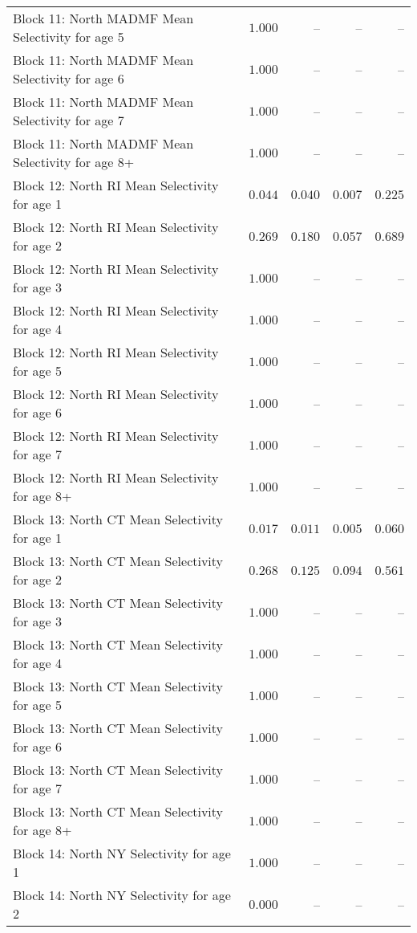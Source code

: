 \documentclass[
]{article}
\begin{document}
\begin{landscape}
\begin{longtable}[t]{lrrrr}
Block 11: North MADMF Mean Selectivity for age 5 & $1.000$ & -- & -- & --\\
Block 11: North MADMF Mean Selectivity for age 6 & $1.000$ & -- & -- & --\\
Block 11: North MADMF Mean Selectivity for age 7 & $1.000$ & -- & -- & --\\
\addlinespace
Block 11: North MADMF Mean Selectivity for age 8+ & $1.000$ & -- & -- & --\\
Block 12: North RI Mean Selectivity for age 1 & $0.044$ & $0.040$ & $0.007$ & $0.225$\\
Block 12: North RI Mean Selectivity for age 2 & $0.269$ & $0.180$ & $0.057$ & $0.689$\\
Block 12: North RI Mean Selectivity for age 3 & $1.000$ & -- & -- & --\\
Block 12: North RI Mean Selectivity for age 4 & $1.000$ & -- & -- & --\\
\addlinespace
Block 12: North RI Mean Selectivity for age 5 & $1.000$ & -- & -- & --\\
Block 12: North RI Mean Selectivity for age 6 & $1.000$ & -- & -- & --\\
Block 12: North RI Mean Selectivity for age 7 & $1.000$ & -- & -- & --\\
Block 12: North RI Mean Selectivity for age 8+ & $1.000$ & -- & -- & --\\
Block 13: North CT Mean Selectivity for age 1 & $0.017$ & $0.011$ & $0.005$ & $0.060$\\
\addlinespace
Block 13: North CT Mean Selectivity for age 2 & $0.268$ & $0.125$ & $0.094$ & $0.561$\\
Block 13: North CT Mean Selectivity for age 3 & $1.000$ & -- & -- & --\\
Block 13: North CT Mean Selectivity for age 4 & $1.000$ & -- & -- & --\\
Block 13: North CT Mean Selectivity for age 5 & $1.000$ & -- & -- & --\\
Block 13: North CT Mean Selectivity for age 6 & $1.000$ & -- & -- & --\\
\addlinespace
Block 13: North CT Mean Selectivity for age 7 & $1.000$ & -- & -- & --\\
Block 13: North CT Mean Selectivity for age 8+ & $1.000$ & -- & -- & --\\
Block 14: North NY Selectivity for age 1 & $1.000$ & -- & -- & --\\
Block 14: North NY Selectivity for age 2 & $0.000$ & -- & -- & --\\

\end{longtable}
\end{landscape}
\end{document}
